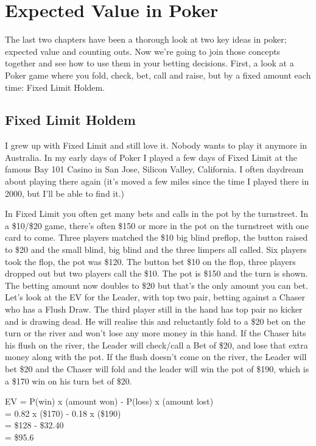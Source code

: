 \chapter{Expected Value in Poker}

The last two chapters have been a thorough look at two key ideas in
poker; expected value and counting outs. Now we're going to join
those concepts together and see how to use them in your betting
decisions. First, a look at a Poker game where you fold, check, bet,
call and raise, but by a fixed amount each time: Fixed Limit Holdem.

\section{Fixed Limit Holdem}

I grew up with Fixed Limit and still love it. Nobody wants to play it
anymore in Australia. In my early days of Poker I played a few days of
Fixed Limit at the famous Bay 101 Casino in San Jose, Silicon Valley,
California. I often daydream about playing there again (it's moved a
few miles since the time I played there in 2000, but I'll be able to
find it.)

In Fixed Limit you often get many bets and calls in the pot by the
turnstreet. In a \$10/\$20 game, there's often \$150 or more in the
pot on the turnstreet with one card to come. Three players matched the
\$10 big blind preflop, the button raised to \$20 and the small blind,
big blind and the three limpers all called. Six players took the flop,
the pot was \$120. The button bet \$10 on the flop, three players
dropped out but two players call the \$10. The pot is \$150 and the turn is
shown. The betting amount now doubles to \$20 but that's the only
amount you can bet. Let's look at the EV for the Leader, with top two
pair, betting against a Chaser who has a Flush Draw. The third player
still in the hand has top pair no kicker and is drawing dead. He will
realise this and reluctantly fold to a \$20 bet on the turn or the
river and won't lose any more money in this hand. If the Chaser hits
his flush on the river, the Leader will check/call a Bet of
\$20, and lose that extra money along with the pot. If the flush
doesn't come on the river, the Leader will bet \$20 and the Chaser will
fold and the leader will win the pot of \$190, which is a \$170 win on
his turn bet of \$20.


EV = P(win) x (amount won) - P(loss) x (amount lost) \\
   = 0.82   x (\$170)      - 0.18    x (\$190) \\
   = \$128 - \$32.40 \\
   = \$95.6

